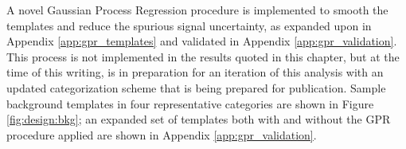A novel Gaussian Process Regression procedure is implemented to smooth the templates and reduce the spurious signal uncertainty, as expanded upon in Appendix \ref{app:gpr_templates} and validated in Appendix \ref{app:gpr_validation}. This process is not implemented in the results quoted in this chapter, but at the time of this writing, is in preparation for an iteration of this analysis with an updated categorization scheme that is being prepared for publication. Sample background templates in four representative categories are shown in Figure \ref{fig:design:bkg}; an expanded set of templates both with and without the GPR procedure applied are shown in Appendix \ref{app:gpr_validation}.

\begin{figure}[!htbp]
\centering
{}
    \\

\end{figure}
